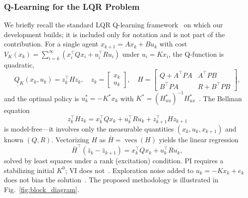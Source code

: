\documentclass[12pt]{elsarticle}
\theoremstyle{remark}
\DeclareMathOperator{\vecs}{vecs}
\begin{document}
\subsubsection{Q-Learning for the LQR Problem}
\label{subsec:ql_background}
We briefly recall the standard LQR Q-learning framework~\cite{bradtke1994,lewis2009,rizvi2022} on which our development builds; it is included only for notation and is not part of the contribution. For a single agent $x_{k+1} = Ax_k + Bu_k$ with cost $V_K(x_k) = \sum_{i=k}^{\infty} (x_i^\top Q x_i + u_i^\top R u_i)$ under $u_i = Kx_i$, the Q-function is quadratic,
\begin{equation}
Q_K(x_k, u_k) = z_k^\top H z_k, \quad z_k = \begin{bmatrix} x_k \\ u_k \end{bmatrix}, \quad
H = \begin{bmatrix} Q + A^\top PA & A^\top PB \\ B^\top PA & R + B^\top PB \end{bmatrix},
\label{eq:Hmatrix}
\end{equation}
and the optimal policy is $u_k^* = -K^*x_k$ with $K^* = (H_{uu}^*)^{-1}H_{ux}^*$~\cite{bradtke1994}. The Bellman equation
\begin{equation}
z_k^\top H z_k = x_k^\top Q x_k + u_k^\top R u_k + z_{k+1}^\top H z_{k+1}
\label{eq:bellman}
\end{equation}
is model-free---it involves only the measurable quantities $(x_k, u_k, x_{k+1})$ and known $(Q, R)$. Vectorizing $H$ as $\bar{H} = \vecs(H)$ yields the linear regression
\begin{equation}
\bar{H}^\top(\bar{z}_k - \bar{z}_{k+1}) = x_k^\top Q x_k + u_k^\top R u_k,
\label{eq:bellman_linear}
\end{equation}
solved by least squares under a rank (excitation) condition. PI requires a stabilizing initial $K^0$; VI does not~\cite{lewis2009}. Exploration noise added to $u_k = -Kx_k + e_k$ does not bias the solution~\cite{bradtke1994,rizvi2022}.
The proposed methodology is illustrated in Fig.~\ref{fig:block_diagram}.
\end{document}
